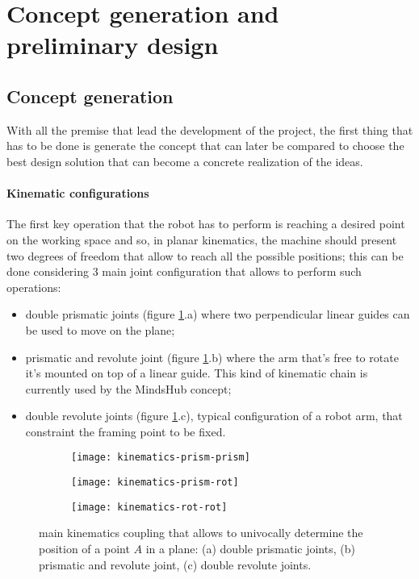 \section{Concept generation and preliminary design}
\subsection{Concept generation}
	With all the premise that lead the development of the project, the first thing that has to be done is generate the concept that can later be compared to choose the best design solution that can become a concrete realization of the ideas.
	
	\paragraph{Kinematic configurations} The first key operation that the robot has to perform is reaching a desired point on the working space and so, in planar kinematics, the machine should present two degrees of freedom that allow to reach all the possible positions; this can be done considering 3 main joint configuration that allows to perform such operations:
	\begin{itemize}
		\item double prismatic joints (figure \ref{fig:kinematiccoupling}.a) where two perpendicular linear guides can be used to move on the plane;
		\item prismatic and revolute joint (figure \ref{fig:kinematiccoupling}.b) where the arm that's free to rotate it's mounted on top of a linear guide. This kind of kinematic chain is currently used by the MindsHub concept;
		\item double revolute joints (figure \ref{fig:kinematiccoupling}.c), typical configuration of a robot arm, that constraint the framing point to be fixed.
	\end{itemize}
	
	\begin{figure}[bht]
	\centering
		\begin{subfigure}{0.32\linewidth}
			\centering \texttt{[image: kinematics-prism-prism]}
			\caption{}
		\end{subfigure}
		\begin{subfigure}{0.32\linewidth}
			\centering \texttt{[image: kinematics-prism-rot]}
			\caption{}
		\end{subfigure}
		\begin{subfigure}{0.32\linewidth}
			\centering \texttt{[image: kinematics-rot-rot]}
			\caption{}
		\end{subfigure}
		\caption{main kinematics coupling that allows to univocally determine the position of a point $A$ in a plane: (a) double prismatic joints, (b) prismatic and revolute joint, (c) double revolute joints.}
		\label{fig:kinematiccoupling}
	\end{figure}
	
